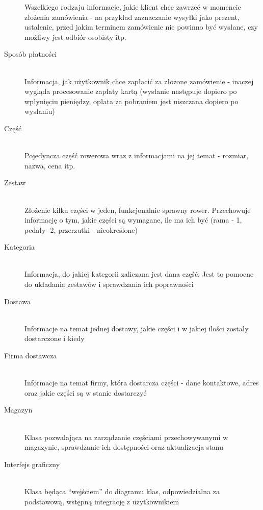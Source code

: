 \begin{description}
		Wszelkiego rodzaju informacje, jakie klient chce zawrzeć w momencie złożenia
		zamówienia - na przykład zaznaczanie wysyłki jako prezent, ustalenie, przed
		jakim terminem zamówienie nie powinno być wysłane, czy możliwy jest odbiór
		osobisty itp.
	\item[Sposób płatności] \hfill \\
		Informacja, jak użytkownik chce zapłacić za złożone zamówienie - inaczej
		wygląda procesowanie zapłaty kartą (wysłanie następuje dopiero po wpłynięciu
		pieniędzy, opłata za pobraniem jest uiszczana dopiero po wysłaniu)
	\item[Część] \hfill \\
		Pojedyncza część rowerowa wraz z informacjami na jej temat - rozmiar, nazwa,
		cena itp.
	\item[Zestaw] \hfill \\
		Złożenie kilku części w jeden, funkcjonalnie sprawny rower. Przechowuje
		informację o tym, jakie części są wymagane, ile ma ich być (rama - 1, pedały
		-2, przerzutki - nieokreślone)
	\item[Kategoria] \hfill \\
		Informacja, do jakiej kategorii zaliczana jest dana część. Jest to pomocne do
		układania zestawów i sprawdzania ich poprawności
	\item[Dostawa] \hfill \\
		Informacje na temat jednej dostawy, jakie części i w jakiej ilości zostały
		dostarczone i kiedy
	\item[Firma dostawcza] \hfill \\
		Informacje na temat firmy, która dostarcza części - dane kontaktowe, adres
		oraz jakie części są w stanie dostarczyć
	\item[Magazyn] \hfill \\
		Klasa pozwalająca na zarządzanie częściami przechowywanymi w magazynie,
		sprawdzanie ich dostępności oraz aktualizacja stanu
	\item[Interfejs graficzny] \hfill \\
		Klasa będąca ``wejściem'' do diagramu klas, odpowiedzialna za podstawową,
		wstępną integrację z użytkownikiem
\end{description}